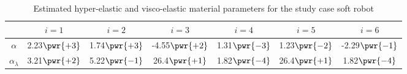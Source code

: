 {\begin{table}[!t]
  \caption{Estimated hyper-elastic and visco-elastic material parameters for the study case soft robot \label{tab:C2:elastic_parameters}}
  \centering
  \begin{tabular}{ccccccc}
  \hline
  & $i=1$ &  $i=2$ &  $i=3$ & $i=4$ &  $i=5$ & $i=6$ \\
  \hline
  \hline
  $\alpha$ &  \small{2.23}$\pwr{+3}$  & \small{1.74}$\pwr{+3}$  &  \small{-4.55}$\pwr{+2}$ & \small{1.31}$\pwr{-3}$  & \small{1.23}$\pwr{-2}$ & \small{-2.29}$\pwr{-1}$ \\[0.15em]
   $\alpha_\lambda$ &  \small{3.21}$\pwr{+2}$ & \small{5.22}$\pwr{-1}$ &  \small{26.4}$\pwr{+1}$& \small{1.82}$\pwr{-4}$ & \small{26.4}$\pwr{+1}$ & \small{1.82}$\pwr{-4}$ \\
  \hline
  \end{tabular}
  \vspace{-3mm}
  \end{table}

  \clearpage
}

